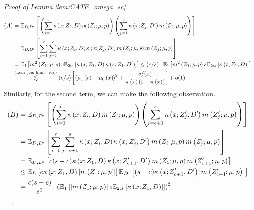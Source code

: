 \begin{proof}[Proof of Lemma \ref{lem:CATE_omega_sc}]
\begin{equation}
\begin{aligned}
            (A)
            & = \mathbb{E}_{D, D^{\prime}}\left[\left(\sum_{i = 1}^{c} \kappa\left(x; Z_{i}, D\right) m\left(Z_{i}; \mu, p\right)\right)
            \left(\sum_{j = 1}^{c} \kappa\left(x; Z_{j}, D^{\prime}\right) m\left(Z_{j}; \mu, p\right)\right)\right] \\
			& = \mathbb{E}_{D, D^{\prime}}\left[
				\sum_{i = 1}^{c} \sum_{j = 1}^{c} \kappa\left(x; Z_{i}, D\right)\kappa\left(x; Z_{j}, D^{\prime}\right) m\left(Z_{i}; \mu, p\right)m\left(Z_{j}; \mu, p\right)
			\right] \\
			& = \mathbb{E}_{1}\left[m^{2}\left(Z_{1}; \mu, p\right) c \mathbb{E}_{2:s}\left[\kappa\left(x; Z_{1}, D\right)\kappa\left(x; Z_{1}, D^{\prime}\right)\right]\right]
			\leq (c/s) \cdot \mathbb{E}_{1}\left[m^{2}\left(Z_{1}; \mu, p\right) s \mathbb{E}_{2:s}\left[\kappa\left(x; Z_{1}, D\right)\right]\right]\\
			& \overset{\text{(Lem \ref{lem:limit_res})}}{\lesssim} (c/s) \left[\left(\mu_1\left(x\right) - \mu_0\left(x\right)\right)^2 + \frac{\sigma_{\varepsilon}^2(x)}{\pi\left(x\right)\left(1 - \pi\left(x\right)\right)}\right] + o(1)
        \end{aligned}
    \end{equation}
	Similarly, for the second term, we can make the following observation.
	\begin{equation}
		\begin{aligned}
			(B) 
			& = \E_{D, D^{\prime}}\left[\left(\sum_{i = 1}^{c} \kappa\left(x; Z_{i}, D\right) m\left(Z_{i}; \mu, p\right)\right)
            \left(\sum_{j = c + 1}^{s} \kappa\left(x; Z_{j}^{\prime}, D^{\prime}\right) m\left(Z_{j}^{\prime}; \mu, p\right)\right)\right] \\
			& = \E_{D,D^{\prime}}\left[\sum_{i = 1}^{c} \sum_{j = c + 1}^{s}\kappa\left(x; Z_{i}, D\right)\kappa\left(x; Z_{j}^{\prime}, D^{\prime}\right) m\left(Z_{i}; \mu, p\right)m\left(Z_{j}^{\prime}; \mu, p\right)\right]\\
			& = \E_{D, D^{\prime}}\left[c (s-c) \kappa\left(x; Z_{1}, D\right)\kappa\left(x; Z_{c+1}^{\prime}, D^{\prime}\right) m\left(Z_{1}; \mu, p\right) m\left(Z_{c+1}^{\prime}; \mu, p\right)\right]\\
			& \leq \E_{D}\left[c \kappa\left(x; Z_{1}, D\right)  \left|m\left(Z_{1}; \mu, p\right)\right|\right]
			\E_{D^{\prime}}\left[(s-c) \kappa\left(x; Z_{c+1}^{\prime}, D^{\prime}\right)  \left| m\left(Z_{c+1}^{\prime}; \mu, p\right) \right|\right]\\
			& = \frac{c(s-c)}{s^2} \cdot \left(\E_{1}\left[\left|m\left(Z_{1}; \mu, p\right)\right| s \E_{2:s}\left[\kappa\left(x; Z_{1}, D\right)\right]\right]\right)^2\\

\end{aligned}
\end{equation}
\end{proof}
